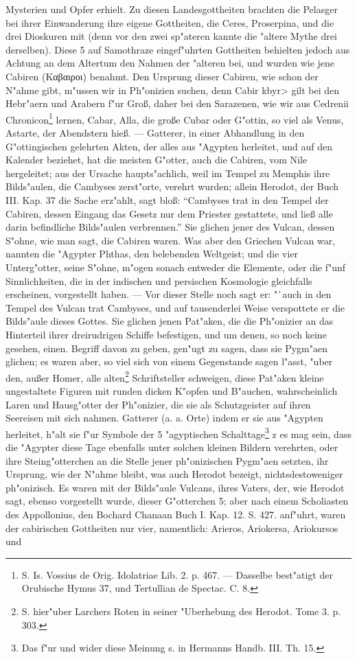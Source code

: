 \documentclass[a4paper, 11pt, oneside, polutonikogreek, german]{article}
\begin{document}
Mysterien und Opfer erhielt. Zu diesen Landesgottheiten brachten die Pelasger bei ihrer Einwanderung ihre eigene Gottheiten, die Ceres, Proserpina, und die drei Dioskuren mit (denn vor den zwei sp"ateren kannte die "altere Mythe drei derselben). Diese 5 auf Samothraze eingef"uhrten Gottheiten behielten jedoch aus Achtung an dem Altertum den Nahmen der "alteren bei, und wurden wie jene Cabiren (Καβαιροι) benahmt. Den Ursprung dieser Cabiren, wie schon der N"ahme gibt, m"ussen wir in Ph"onizien suchen, denn Cabir \<kbyr> gilt bei den Hebr"aern und Arabern f"ur Groß, daher bei den Sarazenen, wie wir aus Cedrenii Chronicon\footnote{S. Is. Vossius de Orig. Idolatriae Lib. 2. p. 467. --- Dasselbe best"atigt der Orubische Hymus 37, und Tertullian de Spectac. C. 8.} lernen, Cabar, Alla, die große Cubar oder G"ottin, so viel als Venus, Astarte, der Abendstern hieß. --- Gatterer, in einer Abhandlung in den G"ottingischen gelehrten Akten, der alles aus "Agypten herleitet, und auf den Kalender beziehet, hat die meisten G"otter, auch die Cabiren, vom Nile hergeleitet; aus der Ursache haupts"achlich, weil im Tempel zu Memphis ihre Bilds"aulen, die Cambyses zerst"orte, verehrt wurden; allein Herodot, der Buch III. Kap. 37 die Sache erz"ahlt, sagt bloß: "`Cambyses trat in den Tempel der Cabiren, dessen Eingang das Gesetz nur dem Priester gestattete, und ließ alle darin befindliche Bilds"aulen verbrennen."' Sie glichen jener des Vulcan, dessen S"ohne, wie man sagt, die Cabiren waren. Was aber den Griechen Vulcan war, nannten die "Agypter Phthas, den belebenden Weltgeist; und die vier Unterg"otter, seine S"ohne, m"ogen sonach entweder die Elemente, oder die f"unf Sinnlichkeiten, die in der indischen und persischen Kosmologie gleichfalls erscheinen, vorgestellt haben. --- Vor dieser Stelle noch sagt er: "`auch in den Tempel des Vulcan trat Cambyses, und auf tausenderlei Weise verspottete er die Bilds"aule dieses Gottes. Sie glichen jenen Pat"aken, die die Ph"onizier an das Hinterteil ihrer dreirudrigen Schiffe befestigen, und um denen, so noch keine gesehen, einen. Begriff davon zu geben, gen"ugt zu sagen, dass sie Pygm"aen glichen; es waren aber, so viel sich von einem Gegenstande sagen l"asst, "uber den, außer Homer, alle alten\footnote{S. hier"uber Larchers Roten in seiner "Uberhebung des Herodot. Tome 3. p. 303.} Schriftsteller schweigen, diese Pat"aken kleine ungestaltete Figuren mit runden dicken K"opfen und B"auchen, wahrscheinlich Laren und Hausg"otter der Ph"onizier, die sie als Schutzgeister auf ihren Seereisen mit sich nahmen. Gatterer (a. a. Orte) indem er sie aus "Agypten herleitet, h"alt sie f"ur Symbole der 5 "agyptischen Schalttage\footnote{Das f"ur und wider diese Meinung s. in Hermanns Handb. III. Th. 15.} z es mag sein, dass die "Agypter diese Tage ebenfalls unter solchen kleinen Bildern verehrten, oder ihre Steing"otterchen an die Stelle jener ph"onizischen Pygm"aen setzten, ihr Ursprung, wie der N"ahme bleibt, was auch Herodot bezeigt, nichtsdestoweniger ph"onizisch. Es waren mit der Bilds"aule Vulcans, ihres Vaters, der, wie Herodot sagt, ebenso vorgestellt wurde, dieser G"otterchen 5; aber nach einem Scholiasten des Appollonius, den Bochard Chanaan Buch I. Kap. 12. S. 427. anf"uhrt, waren der cabirischen Gottheiten nur vier, namentlich: Arieros, Ariokersa, Ariokursos und 
\end{document}
